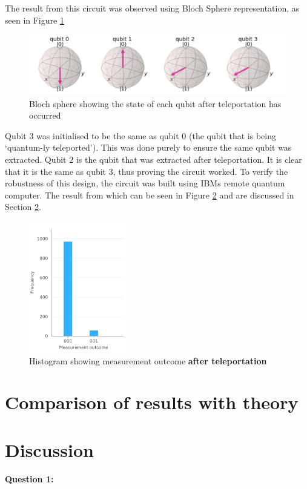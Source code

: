 The result from this circuit was observed using Bloch Sphere representation, as seen in Figure \ref{fig:teleportBloch}
\begin{figure}[h]
    \centering
    \includegraphics[width=\textwidth]{lab3/images/teleportBloch.png}
    \caption{Bloch sphere showing the state of each qubit after teleportation has occurred}
    \label{fig:teleportBloch}
\end{figure}

Qubit 3 was initialised to be the same as qubit 0 (the qubit that is being `quantum-ly teleported'). This was done purely to ensure the same qubit was extracted. Qubit 2 is the qubit that was extracted after teleportation. It is clear that it is the same as qubit 3, thus proving the circuit worked. To verify the robustness of this design, the circuit was built using IBMs remote quantum computer. The result from which can be seen in Figure \ref{fig:ibmTeleport} and are discussed in Section \ref{sec:discussTeleport}.
\begin{figure}[h]
    \centering
    \includegraphics[width=0.38\textwidth]{lab3/images/ibmTeleport.png}
    \caption{Histogram showing measurement outcome \textbf{after teleportation}}
    \label{fig:ibmTeleport}
\end{figure}

\section{Comparison of results with theory}
\section{Discussion} \label{sec:discussTeleport}
\textbf{Question 1:}

